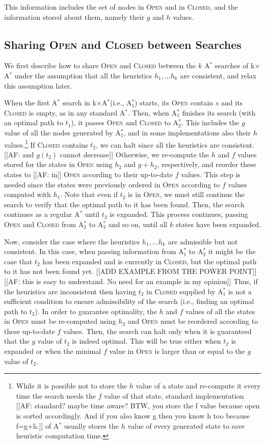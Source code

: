 \documentclass[twoside,11pt]{article}
\newcommand{\astar}{A$^*$\xspace}
\newcommand{\kxastar}{k$\times$A$^*$\xspace}
\newcommand{\astari}[1]{A$^*_{#1}$\xspace}
\newcommand{\open}{\textsc{Open}\xspace}
\newcommand{\closed}{\textsc{Closed}\xspace}
\begin{document}
This information includes the set of nodes in \open and in \closed, and the information stored about them, namely their $g$ and $h$ values. 


\subsection{Sharing \open and \closed between Searches}

We first describe how to share \open and \closed between the $k$ \astar searches of \kxastar under the assumption that all the heuristics $h_1, \ldots h_k$ are consistent, and relax this assumption later. 

When the first \astar search in \kxastar (i.e., \astari{1}) starts, its \open contain $s$ and its \closed is empty, as in any standard \astar.
Then, when \astari{1} finishes its search (with an optimal path to $t_1$), it passes \open and \closed to \astari{2}.
This includes the $g$ value of all the nodes generated by \astari{1}, and in some implementations also their $h$ values.\footnote{While it is possible not to store the $h$ value of a state and re-compute it every time the search needs the $f$ value of that state, standard implementation [[AF: standard? maybe time aware? BTW, you store the f value because open is sorted accordingly. And if you also know g then you know h too because f=g+h.]] of \astar usually stores the $h$ value of every generated state to save heuristic computation time.} 
If \closed contains $t_2$, we can halt since all the heuristics are consistent.[[AF: and $g(t_2)$ cannot decrease]]
Otherwise, we re-compute the $h$ and $f$ values stored for the states in \open using $h_2$ and $g+h_2$, respectively, and reorder these states to [[AF: in]] \open according to their up-to-date $f$ values.
This step is needed since the states were previously ordered in \open according to $f$ values computed with $h_1$.
Note that even if $t_2$ is in \open, we must still continue the search to verify that the optimal path to it has been found.
Then, the search continues as a regular \astar until $t_2$ is expanded.
This process continues, passing \open and \closed from \astari{2} to \astari{3} and so on, until all $k$ states have been expanded.

Now, consider the case where the heuristics $h_1, \ldots h_k$ are admissible but not consistent.
In this case, when passing information from \astari{1} to \astari{2} it might be the case that $t_2$ has been expanded and is currently in \closed, but the optimal path to it has not been found yet.
[[ADD EXAMPLE FROM THE POWER POINT]][[AF: this is easy to understand. No need for an example in my opinion]]
Thus, if the heuristics are inconsistent then having $t_2$ in \closed supplied by \astari{1} is not a sufficient condition to ensure admissibility of the search (i.e., finding an optimal path to $t_2$).
In order to guarantee optimality, the $h$ and $f$ values of all the states in \open must be re-computed using $h_2$ and \open must be reordered according to these up-to-date $f$ values.
Then, the search can halt only when it is guaranteed that the $g$ value of $t_2$ is indeed optimal. This will be true either when $t_2$ is expanded or when the minimal $f$ value in \open is larger than or equal to the $g$ value of $t_2$.
\end{document}
